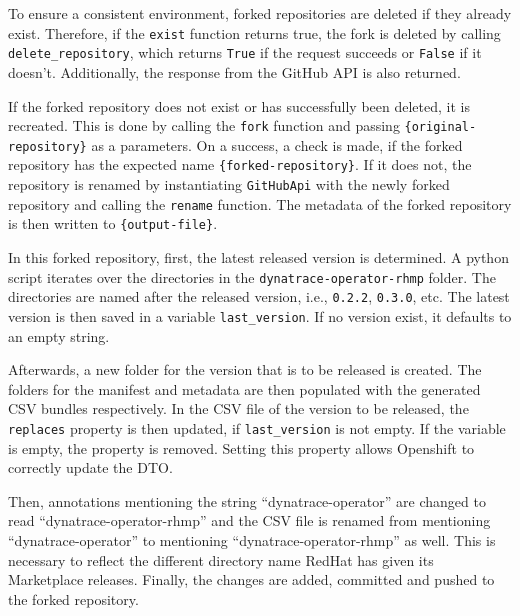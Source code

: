 To ensure a consistent environment, forked repositories are deleted if they already exist.
Therefore, if the \verb|exist| function returns true, the fork is deleted by calling \verb|delete_repository|, which returns \verb|True| if the request succeeds or \verb|False| if it doesn't.
Additionally, the response from the GitHub API is also returned.

If the forked repository does not exist or has successfully been deleted, it is recreated.
This is done by calling the \verb|fork| function and passing \verb|{original-repository}| as a parameters.
On a success, a check is made, if the forked repository has the expected name \verb|{forked-repository}|.
If it does not, the repository is renamed by instantiating \verb|GitHubApi| with the newly forked repository and calling the \verb|rename| function.
The metadata of the forked repository is then written to \verb|{output-file}|.

In this forked repository, first, the latest released version is determined.
A python script iterates over the directories in the \verb|dynatrace-operator-rhmp| folder.
The directories are named after the released version, i.e., \verb|0.2.2|, \verb|0.3.0|, etc.
The latest version is then saved in a variable \verb|last_version|.
If no version exist, it defaults to an empty string.

Afterwards, a new folder for the version that is to be released is created.
The folders for the manifest and metadata are then populated with the generated CSV bundles respectively.
In the CSV file of the version to be released, the \verb|replaces| property is then updated, if \verb|last_version| is not empty.
If the variable is empty, the property is removed.
Setting this property allows Openshift to correctly update the DTO.

Then, annotations mentioning the string ``dynatrace-operator'' are changed to read ``dynatrace-operator-rhmp'' and the CSV file is renamed from  mentioning ``dynatrace-operator'' to mentioning ``dynatrace-operator-rhmp'' as well.
This is necessary to reflect the different directory name RedHat has given its Marketplace releases.
Finally, the changes are added, committed and pushed to the forked repository.
